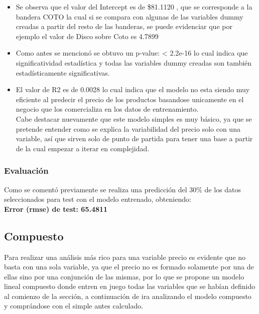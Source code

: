 \begin{itemize}
	\item Se observa que el valor del Intercept es de \$81.1120 , que se corresponde a la bandera COTO la cual si se compara con algunas de las variables dummy creadas a partir del resto de las banderas, se puede evidenciar que por ejemplo el valor de Disco sobre Coto es 4.7899
	
	\item Como antes se mencionó se obtuvo un p-value: < 2.2e-16 lo cual indica que significatividad estadística y todas las variables dummy creadas son también estadísticamente significativas. 
    
    \item El valor de R2 es de 0.0028 lo cual indica que el modelo no esta siendo muy eficiente al predecir el precio de los productos basandose unicamente en el negocio que los comercializa en los datos de entrenamiento.\\
    Cabe destacar nuevamente que este modelo simples es muy básico, ya que se pretende entender como se explica la variabilidad del precio solo con una variable, así que sirven solo de punto de partida para tener una base a partir de la cual empezar a iterar en complejidad.
\end{itemize}
	
\subsubsection{Evaluación}
Como se comentó previamente se realiza una predicción del 30\% de los datos seleccionados para test con el modelo entrenado, obteniendo:\\
\textbf{Error (rmse) de test: 65.4811}

\subsection{Compuesto}


Para realizar una análisis más rico para una variable precio es evidente que no basta con una sola variable, ya que el precio no es formado solamente por una de ellas sino por una conjunción de las mismas, por lo que se propone un modelo lineal compuesto donde entren en juego todas las variables que se habían definido al comienzo de la sección, a continuación de ira analizando el modelo compuesto y comprándose con el simple antes calculado.\\



